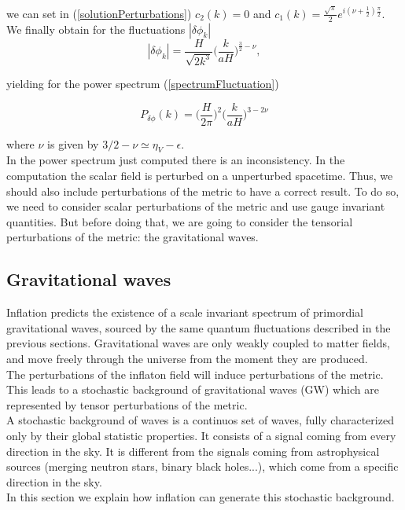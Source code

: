 \documentclass[11pt,a4paper,twoside]{book}
\begin{document}
we can set in (\ref{solutionPerturbations})  $ c_{2}(k)=0 $ and $ c_{1}(k)=\frac{\sqrt{\pi}}{2}e^{i(\nu + \frac{1}{2})\frac{\pi}{2}} $.\\
We finally obtain for the fluctuations $ |\delta \phi_{k}| $ 
\begin{equation}
	\label{solutionDeltaPhi}
	|\delta \phi_{k}|= \frac{H}{\sqrt{2 k^{3}}}\Big (\frac{k}{aH}\Big)^{\frac{3}{2}-\nu},
\end{equation}

yielding for the power spectrum (\ref{spectrumFluctuation})

\begin{equation}
	\label{PowerSpectrumperturbation}
	P_{\delta \phi}(k) = \Big (\frac{H}{2\pi}\Big)^{2}\Big (\frac{k}{aH}\Big)^{3-2\nu}
\end{equation}

where $ \nu $ is given by $ 3/2 - \nu \simeq \eta_{V} - \epsilon$.\\
In the power spectrum just computed there is an inconsistency. In the computation the scalar field is perturbed on a unperturbed spacetime. Thus, we should also include perturbations of the metric to have a correct result. To do so, we need to consider scalar perturbations of the metric and use gauge invariant quantities. But before doing that, we are going to consider the tensorial perturbations of the metric: the gravitational waves.

\subsection{Gravitational waves}
Inflation predicts the existence of a scale invariant spectrum of primordial gravitational waves, sourced by the same quantum fluctuations described in the previous sections. Gravitational waves are only weakly coupled to matter fields, and move freely through the universe from the moment they are produced.\\
The perturbations of the inflaton field will induce perturbations of the metric. This leads to a stochastic background of gravitational waves (GW)  which are represented by tensor perturbations of the metric.\\
A stochastic background of waves is a continuos set of waves, fully characterized  only by their global statistic properties. It consists of a signal coming from every direction in the sky. It is different from the signals coming from astrophysical sources (merging neutron stars,  binary black holes...), which come from a specific direction in the sky. \\
In this section we explain how inflation can generate this stochastic background. 
\end{document}
